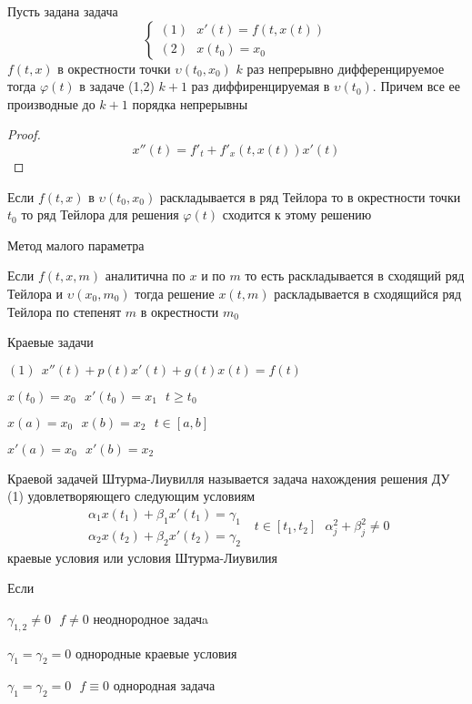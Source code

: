 \begin{theorem}
  Пусть задана задача
  $$
  \left\{
  \begin{array}{l}
    (1) ~~~ x'(t) = f(t, x(t)) \\
    (2) ~~~ x(t_0) = x_0
  \end{array}
  \right.
  $$
  $f(t,x)$ в окрестности точки $\upsilon(t_0, x_0)$ $k$ раз непрерывно
  дифференцируемое тогда $\varphi(t)$ в задаче (1,2) $k+1$ раз диффиренцируемая
  в $\upsilon(t_0)$. Причем все ее производные до $k+1$ порядка непрерывны
\end{theorem}

\begin{proof}
  $$
  x''(t) = f'_t + f'_x(t, x(t))x'(t)
  $$
\end{proof}

\begin{theorem}
  Если $f(t,x)$ в $\upsilon(t_0, x_0)$ раскладывается в ряд Тейлора то в
  окрестности точки $t_0$ то ряд Тейлора для решения $\varphi(t)$ сходится к
  этому решению
\end{theorem}

\begin{title}[\Large]
  Метод малого параметра
\end{title}


\begin{theorem}
  Если $f(t,x,m)$ аналитична по $x$ и по $m$ то есть раскладывается в сходящий
  ряд Тейлора и $\upsilon (x_0, m_0)$ тогда решение $x(t,m)$ раскладывается в
  сходящийся ряд Тейлора по степенят $m$  в окрестности $m_0$
\end{theorem}

\begin{title}[\Large]
  Краевые задачи
\end{title}

\begin{define}
  $(1) ~~ x''(t) + p(t) x'(t) + g(t)x(t) = f(t)$

  $x(t_0) = x_0 ~~~ x'(t_0) = x_1 ~~~ t \ge t_0$

  $x(a) = x_0 ~~~ x(b) = x_2 ~~~ t \in [a,b]$

  $x'(a) = x_0 ~~~ x'(b) = x_2$

  Краевой задачей Штурма-Лиувилля называется задача нахождения решения
  ДУ (1) удовлетворяющего следующим условиям
  $$
  \begin{array}{l}
    \alpha_1 x(t_1) + \beta_1x'(t_1) = \gamma_1 \\
    \alpha_2 x(t_2) + \beta_2 x'(t_2) = \gamma_2
  \end{array}
  ~~~ t \in [t_1, t_2] ~~~ \alpha_j^2 + \beta_j^2 \not= 0
  $$
  краевые условия или условия Штурма-Лиувилия

  Если

  $\gamma_{1,2} \not= 0 ~~~ f \not= 0$ неоднородное задачa

  $\gamma_1 = \gamma_2 = 0$ однородные краевые условия

  $\gamma_1 = \gamma_2 = 0 ~~~ f \equiv 0$ однородная задача
\end{define}


